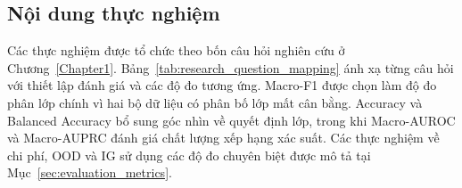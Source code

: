 \subsection{Nội dung thực nghiệm}
\label{sec:experiment_content}
Các thực nghiệm được tổ chức theo bốn câu hỏi nghiên cứu ở Chương~\ref{Chapter1}. Bảng~\ref{tab:research_question_mapping} ánh xạ từng câu hỏi với thiết lập đánh giá và các độ đo tương ứng. Macro-F1 được chọn làm độ đo phân lớp chính vì hai bộ dữ liệu có phân bố lớp mất cân bằng. Accuracy và Balanced Accuracy bổ sung góc nhìn về quyết định lớp, trong khi Macro-AUROC và Macro-AUPRC đánh giá chất lượng xếp hạng xác suất. Các thực nghiệm về chi phí, OOD và IG sử dụng các độ đo chuyên biệt được mô tả tại Mục~\ref{sec:evaluation_metrics}.

\begin{table}[htbp]
\centering
{}
\end{table}
